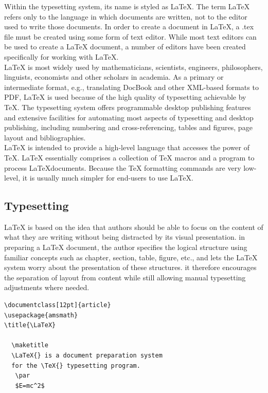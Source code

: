 \hspace{-1.8em} Within the typesetting system, its name is styled as \LaTeX. The term 
\LaTeX{} refers only to the language in which documents are written, 
not to the editor used to write those documents. In order to create a 
document in \LaTeX, a .tex file must be created using some form of text 
editor. While most text editors can be used to create a \LaTeX{} document, 
a number of editors have been created specifically for working with \LaTeX.\\

\noindent\LaTeX{} is most widely used by mathematicians, scientists, 
engineers, philosophers, linguists, economists and other scholars in 
academia. As a primary or intermediate format, e.g., translating DocBook 
and other XML-based formats to PDF, \LaTeX{} is used because of the 
high quality of typesetting achievable by \TeX. The typesetting system 
offers programmable desktop publishing features and extensive facilities 
for automating most aspects of typesetting and desktop publishing, 
including numbering and cross-referencing, tables and figures, 
page layout and bibliographies.\\

\noindent\LaTeX{} is intended to provide a high-level language that
accesses the power of \TeX. \LaTeX{} essentially comprises a
collection of \TeX{} macros and a program to process \LaTeX documents. 
Because the \TeX{} formatting commands are very low-level, it is usually 
much simpler for end-users to use \LaTeX{}.


\subsection{Typesetting}
\LaTeX{} is based on the idea that authors should be able to focus on 
the content of what they are writing without being distracted by its 
visual presentation. in preparing a \LaTeX{} document, the author 
specifies the logical structure using familiar concepts such as 
chapter, section, table, figure, etc., and lets the \LaTeX{} system 
worry about the presentation of these structures. it therefore 
encourages the separation of layout from content while still allowing 
manual typesetting adjustments where needed. 

\begin{verbatim}
\documentclass[12pt]{article}
\usepackage{amsmath}
\title{\LaTeX}

  \maketitle 
  \LaTeX{} is a document preparation system 
  for the \TeX{} typesetting program.
   \par 
   $E=mc^2$

\end{verbatim}

